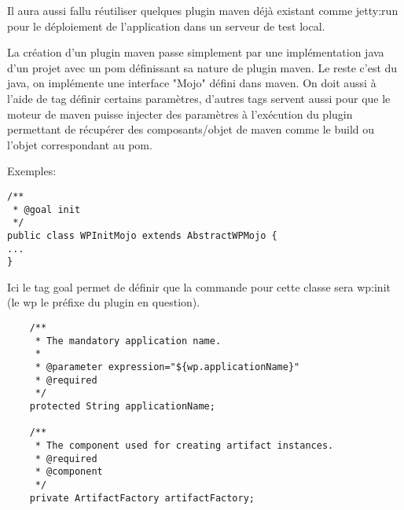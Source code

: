 Il aura aussi fallu réutiliser quelques plugin maven déjà existant comme jetty:run
pour le déploiement de l'application dans un serveur de test local. 

La création d'un plugin maven passe simplement par une implémentation java d'un
projet avec un pom définissant sa nature de plugin maven. Le reste c'est du java,
on implémente une interface "Mojo" défini dans maven. On doit aussi à l'aide de 
tag définir certains paramètres, d'autres tags servent aussi pour que le moteur
de maven puisse injecter des paramètres à l'exécution du plugin permettant de
récupérer des composants/objet de maven comme le build ou l'objet correspondant
au pom.


Exemples:

\begin{lstlisting}
/**
 * @goal init
 */
public class WPInitMojo extends AbstractWPMojo {
...
}
\end{lstlisting}

Ici le tag goal permet de définir que la commande pour cette classe sera wp:init
(le wp le préfixe du plugin en question). 

\begin{lstlisting}
    /**
     * The mandatory application name.
     *
     * @parameter expression="${wp.applicationName}"
     * @required
     */
    protected String applicationName;

    /**
     * The component used for creating artifact instances.
     * @required
     * @component
     */
    private ArtifactFactory artifactFactory;

\end{lstlisting}

